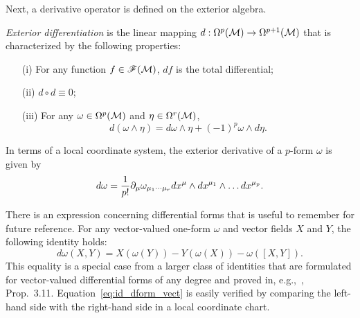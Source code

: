 \documentclass[
final,
11pt,
a4paper,
DIV=11,
headinclude=true,
footinclude=false,
bibliography=totoc,
twoside=true,  %
BCOR=5mm
]{scrbook}
\begin{document}
Next, a derivative operator is defined on the exterior algebra.
\begin{definition}
\emph{Exterior differentiation} is the linear mapping $d : 
\Omega^{p}(\mathcal{M}) \to \Omega^{p+1}(\mathcal{M})$ that is 
characterized by the following properties:
\begin{itemize}
  \item[(i)] For any function $f \in \mathscr{F}(\mathcal{M})$, $df$ 
    is the total differential;
  \item[(ii)] $d \circ d \equiv 0$;
  \item[(iii)] For any $\omega \in \Omega^p(\mathcal{M})$ and $\eta 
    \in \Omega^r(\mathcal{M})$,
    \begin{equation*}
      d(\omega \wedge \eta) = d\omega \wedge \eta + {(-1)}^p 
      \omega \wedge d\eta.
    \end{equation*}
\end{itemize}
\end{definition}

In terms of a local coordinate system, the exterior derivative of 
a $p$-form $\omega$ is given by
\begin{equation*}
  d\omega = \frac{1}{p!} \partial_\mu \omega_{\mu_1\cdots \mu_r} 
  dx^{\mu} \wedge dx^{\mu_1} \wedge \ldots dx^{\mu_p}.
\end{equation*}

There is an expression concerning differential forms that is 
useful to remember for future reference. For any vector-valued 
one-form $\omega$ and vector fields $X$ and $Y$, the following 
identity holds:
\begin{equation}
\label{eq:id_dform_vect}
  d\omega(X,Y) = X(\omega(Y)) - Y(\omega(X)) - \omega([X,Y]).
\end{equation}
This equality is a special case from a larger class of identities 
that are formulated for vector-valued differential forms of any 
degree and proved in, e.g.,~\cite{kob1996found}, Prop.~3.11.  
Equation~\eqref{eq:id_dform_vect} is easily verified by comparing 
the left-hand side with the right-hand side in a local coordinate 
chart.
\end{document}
